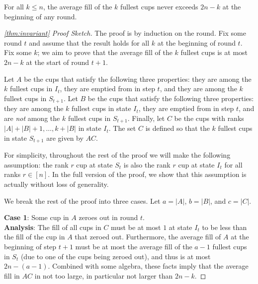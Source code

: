 \begin{theorem}
  \label{thm:TO_invariant}
 For all $k \le n$, the average fill of the $k$ fullest cups never exceeds $2n-k$ at the beginning of any round.
\end{theorem}
\begin{proof}[\cref{thm:invariant} Proof Sketch]
 The proof is by induction on the round. Fix some
round $t$ and assume that the result holds for all $k$ at the beginning of round $t$. Fix
some $k$; we aim to prove that the average fill of the $k$
fullest cups is at most $2n-k$ at the start of round $t+1$. 

Let $A$ be the cups that satisfy the following three properties: they
are among the $k$ fullest cups in $I_t$, they are emptied from in step
$t$, and they are among the $k$ fullest cups in $S_{t+1}$. Let $B$ be
the cups that satisfy the following three properties: they are among
the $k$ fullest cups in state $I_t$, they are emptied from in step
$t$, and are \emph{not} among the $k$ fullest cups in
$S_{t+1}$. Finally, let $C$ be the cups with ranks
$|A| + |B| + 1, \ldots, k + |B|$ in state $I_t$. The set $C$ is
defined so that the $k$ fullest cups in state $S_{t+1}$ are given by $AC$.

For simplicity, throughout the rest of the proof we will make the
following assumption: the rank $r$ cup at state $S_t$ is also the rank
$r$ cup at state $I_t$ for all ranks $r \in [n]$. In the full version
of the proof, we show that this assumption is
actually without loss of generality.


We break the rest of the proof into three cases. Let $a = |A|$,
$b = |B|$, and $c = |C|$. 

\vspace{.3 cm}

\noindent\textbf{Case 1}:
Some cup in $A$ zeroes out in round $t$.\\
\textbf{Analysis}: The fill of all cups in $C$ must be at most $1$ at
state $I_t$ to be less than the fill of the cup in $A$ that zeroed
out. Furthermore, the average fill of $A$ at the beginning of step
$t + 1$ must be at most the average fill of the $a - 1$ fullest cups
in $S_t$ (due to one of the cups being zeroed out), and thus is at
most $2n-(a - 1)$. Combined with some algebra, these facts imply
that the average fill in $AC$ in  not too large, in particular not
larger than $2n-k$.

\vspace{.3 cm}


\end{proof}

